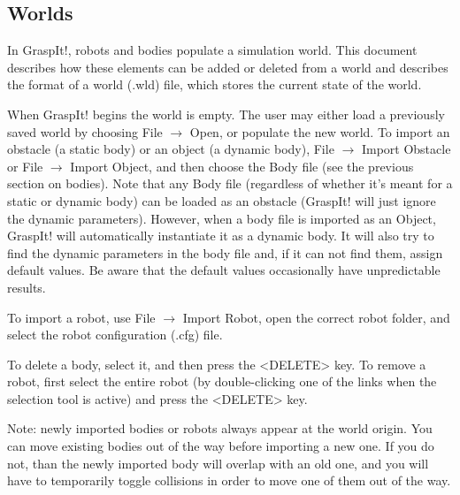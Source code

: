\subsection{Worlds}

In GraspIt!, robots and bodies populate a simulation world. This
document describes how these elements can be added or deleted from a
world and describes the format of a world (.wld) file, which stores
the current state of the world.

When GraspIt! begins the world is empty. The user may either load a
previously saved world by choosing File $\rightarrow$ Open, or populate the new
world. To import an obstacle (a static body) or an object (a dynamic
body), File $\rightarrow$ Import Obstacle or File $\rightarrow$ Import Object, and then
choose the Body file (see the previous section on bodies). Note that
any Body file (regardless of whether it's meant for a static or
dynamic body) can be loaded as an obstacle (GraspIt! will just ignore
the dynamic parameters). However, when a body file is imported as an
Object, GraspIt! will automatically instantiate it as a dynamic
body. It will also try to find the dynamic parameters in the body file
and, if it can not find them, assign default values. Be aware that the
default values occasionally have unpredictable results.

To import a robot, use File $\rightarrow$ Import Robot, open the correct robot
folder, and select the robot configuration (.cfg) file.

To delete a body, select it, and then press the <DELETE> key. To
remove a robot, first select the entire robot (by double-clicking one
of the links when the selection tool is active) and press the <DELETE>
key.

Note: newly imported bodies or robots always appear at the world
origin. You can move existing bodies out of the way before importing a
new one. If you do not, than the newly imported body will overlap with
an old one, and you will have to temporarily toggle collisions in
order to move one of them out of the way.

